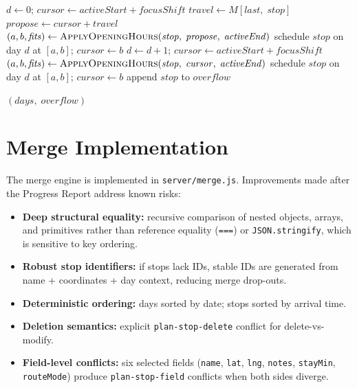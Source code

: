 \begin{algorithm}[H]
\begin{algorithmic}[1]
    \Statex
    \Statex {}
    \State $d \gets 0$; \; $\mathit{cursor} \gets \mathit{activeStart} + \mathit{focusShift}$
      \State $\mathit{travel} \gets M[\mathit{last},\;\mathit{stop}]$
      \State $\mathit{propose} \gets \mathit{cursor} + \mathit{travel}$
      \State $(a, b, \mathit{fits}) \gets \Call{ApplyOpeningHours}{\mathit{stop},\;\mathit{propose},\;\mathit{activeEnd}}$
        \State schedule $\mathit{stop}$ on day $d$ at $[a, b]$; \; $\mathit{cursor} \gets b$
      \Else
          \State $d \gets d + 1$; \; $\mathit{cursor} \gets \mathit{activeStart} + \mathit{focusShift}$
          \State $(a, b, \mathit{fits}) \gets \Call{ApplyOpeningHours}{\mathit{stop},\;\mathit{cursor},\;\mathit{activeEnd}}$
        \EndWhile
          \State schedule $\mathit{stop}$ on day $d$ at $[a, b]$; \; $\mathit{cursor} \gets b$
        \Else
          \State append $\mathit{stop}$ to $\mathit{overflow}$
        \EndIf
      \EndIf
    \EndFor

    \Statex
    \State \Return $(\mathit{days},\;\mathit{overflow})$
  \end{algorithmic}
\end{algorithm}

\section{Merge Implementation}
The merge engine is implemented in \texttt{server/merge.js}. Improvements made
after the Progress Report address known risks:
\begin{itemize}
  \item \textbf{Deep structural equality:} recursive comparison of nested
        objects, arrays, and primitives rather than reference equality
        (\texttt{===}) or \texttt{JSON.stringify}, which is sensitive to
        key ordering.
  \item \textbf{Robust stop identifiers:} if stops lack IDs, stable IDs are
        generated from name + coordinates + day context, reducing merge
        drop-outs.
  \item \textbf{Deterministic ordering:} days sorted by date; stops sorted by
        arrival time.
  \item \textbf{Deletion semantics:} explicit \texttt{plan-stop-delete} conflict
        for delete-vs-modify.
  \item \textbf{Field-level conflicts:} six selected fields (\texttt{name},
        \texttt{lat}, \texttt{lng}, \texttt{notes}, \texttt{stayMin},
        \texttt{routeMode}) produce \texttt{plan-stop-field} conflicts when both
        sides diverge.
\end{itemize}

